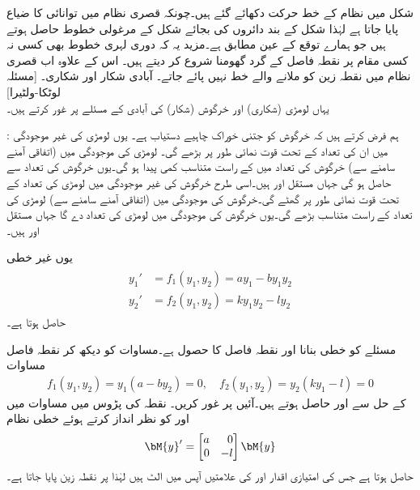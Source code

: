 شکل  میں نظام  کے خط حرکت دکھائے گئے ہیں۔چونکہ قصری نظام میں توانائی کا ضیاع پایا جاتا ہے لہٰذا شکل  کے بند دائروں کی بجائے شکل  کے مرغولی خطوط حاصل ہوتے ہیں جو ہمارے توقع کے عین مطابق ہے۔مزید یہ کہ دوری لہری خطوط بھی کسی نہ کسی مقام پر نقطہ فاصل کے گرد گھومنا شروع کر دیتے ہیں۔ اس کے علاوہ اب قصری نظام میں نقطہ زین کو ملانے والے خط نہیں پائے جاتے۔
\quad آبادی شکار اور شکاری۔ [مسئلہ لوٹکا-ولٹیرا]\\
یہاں لومڑی (شکاری) اور خرگوش (شکار) کی آبادی کے مسئلے پر غور کرتے ہیں۔

: ہم فرض کرتے ہیں کہ خرگوش کو جتنی خوراک چاہیے دستیاب ہے۔ یوں لومڑی کی غیر موجودگی میں ان کی تعداد  کے تحت قوت نمائی طور پر بڑھے گی۔ لومڑی کی موجودگی میں (اتفاقی آمنے سامنے سے)  خرگوش کی تعداد میں  کے راست متناسب کمی پیدا ہو گی۔یوں خرگوش کی تعداد  سے حاصل ہو گی جہاں مستقل  اور  ہیں۔اسی طرح خرگوش کی غیر موجودگی میں لومڑی کی تعداد  کے تحت قوت نمائی طور پر گھٹے گی۔خرگوش کی موجودگی میں (اتفاقی آمنے سامنے سے) لومڑی کی تعداد  کے راست متناسب بڑھے گی۔یوں خرگوش کی موجودگی میں   لومڑی کی تعداد دے گا جہاں مستقل  اور  ہیں۔

یوں غیر خطی  
\begin{gather}\label{مثال_نظام_شکار_شکاری_الف}
\begin{aligned}
y_1'&=f_1(y_1,y_2)=ay_1-by_1y_2\\
y_2'&=f_2(y_1,y_2)=ky_1y_2-ly_2
\end{aligned}
\end{gather}
حاصل ہوتا ہے۔

 مسئلے کو خطی بنانا اور نقطہ فاصل  کا حصول  ہے۔مساوات  کو دیکھ کر نقطہ فاصل مساوات 
\begin{align}
f_1(y_1,y_2)=y_1(a-by_2)=0, \quad f_2(y_1,y_2)=y_2(ky_1-l)=0
\end{align}
کے حل سے  اور  حاصل ہوتے ہیں۔آئیں  پر غور کریں۔ نقطہ  کی پڑوس میں مساوات  میں  اور  کو نظر انداز کرتے ہوئے خطی نظام
\begin{align*}
\bM{y}'=\begin{bmatrix*}[r] a&0\\0&-l \end{bmatrix*}\bM{y}
\end{align*}
حاصل ہوتا ہے جس کی امتیازی اقدار  اور  کی علامتیں آپس میں الٹ ہیں لہٰذا  پر نقطہ زین پایا جاتا ہے۔

